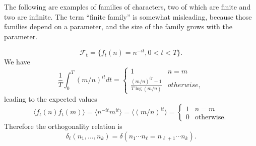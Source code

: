 \documentclass[12pt,letterpaper]{amsart}
\theoremstyle{plain}
\theoremstyle{definition}
\theoremstyle{remark}
\numberwithin{equation}{subsection}
\numberwithin{theorem}{subsection}
\numberwithin{table}{subsection}
\begin{document}
The following are examples of families of characters, two of which are
finite and two are infinite.  The term ``finite family'' is
somewhat misleading, because those families depend on a parameter,
and the size of the family grows with the parameter.    

\begin{equation}
{\mathcal F}_{\text{t}}=\{f_t(n)=n^{-it},0<t<T\}.
\end{equation}
We have
\begin{equation}
\frac{1}{T}\int_0^T (m/n)^{it} dt =
\begin{cases}
1 & n=m \\
\frac{(m/n)^{i T} -1}{T\log(m/n)} & otherwise ,
\end{cases}
\end{equation}
leading to the
expected values
\begin{equation}
\langle f_t(n)\overline{f_t(m)} \rangle=\langle  n^{-it} m^{it} \rangle
= \langle  (m/n)^{it} \rangle 
=
\begin{cases}
1& n=m\\
0& \text{otherwise}.
\end{cases}
\end{equation}
Therefore the orthogonality relation is
\begin{equation}
\delta_\ell(n_1,\dots,n_{k})=\delta(n_1\cdots n_\ell = n_{\ell+1}\cdots n_{k}).
\end{equation}

\end{document}
